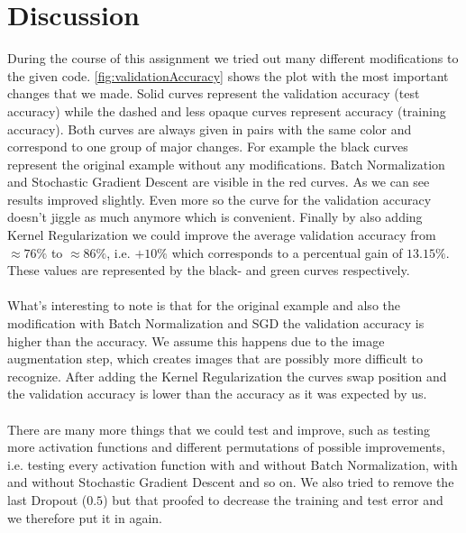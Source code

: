 \documentclass{article}
\begin{document}
	\section{Discussion}
	\label{sec:Discussion}
	During the course of this assignment we tried out many different modifications to the given code. \autoref{fig:validationAccuracy} shows the plot with the most important changes that we made. Solid curves represent the validation accuracy (test accuracy) while the dashed and less opaque curves represent accuracy (training accuracy). Both curves are always given in pairs with the same color and correspond to one group of major changes. For example the black curves represent the original example without any modifications. Batch Normalization and Stochastic Gradient Descent are visible in the red curves. As we can see results improved slightly. Even more so the curve for the validation accuracy doesn't jiggle as much anymore which is convenient. Finally by also adding Kernel Regularization we could improve the average validation accuracy from $\approx76\%$ to $\approx86\%$, i.e. $+10\%$ which corresponds to a percentual gain of $13.15\%$. These values are represented by the black- and green curves respectively. \\
	\\
	What's interesting to note is that for the original example and also the modification with Batch Normalization and SGD the validation accuracy is higher than the accuracy. We assume this happens due to the image augmentation step, which creates images that are possibly more difficult to recognize. After adding the Kernel Regularization the curves swap position and the validation accuracy is lower than the accuracy as it was expected by us. \\
	\\
	There are many more things that we could test and improve, such as testing more activation functions and different permutations of possible improvements, i.e. testing every activation function with and without Batch Normalization, with and without Stochastic Gradient Descent and so on. We also tried to remove the last Dropout ($0.5$) but that proofed to decrease the training and test error and we therefore put it in again. 

	
	
\end{document}
